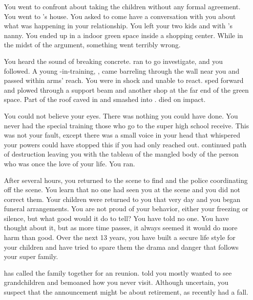 \documentclass[char]{LRSguildcamp1}
\begin{document}
You went to confront \cAS{} about taking the children without any formal agreement. You went to \cOS{}'s house. You asked \cAS{} to come have a conversation with you about what was happening in your relationship. You left your two kids and \cGrad{} with \cGrad{}'s nanny. You ended up in a indoor green space inside a shopping center. While in the midst of the argument, something went terribly wrong.

You heard the sound of breaking concrete. \cAS{} ran to go investigate, and you followed. A young \cJuggernaut{\hero}-in-training, \cJuggernaut{}, came barreling through the wall near you and passed within arms' reach. You were in shock and unable to react. \cJuggernaut{} sped forward and plowed through a support beam and another shop at the far end of the green space. Part of the roof caved in and smashed into \cAS{}. \cAS{\They} died on impact. 

You could not believe your eyes. There was nothing you could have done.  You never had the special training those who go to the super high school receive. This was not your fault, except there was a small voice in your head that whispered your powers could have stopped this if you had only reached out. \cJuggernaut{} continued \cJuggernaut{\their} path of destruction leaving you with the tableau of the mangled body of the person who was once the love of your life. You ran. 

After several hours, you returned to the scene to find \cOS{} and the police coordinating off the scene. You learn that no one had seen you at the scene and you did not correct them. Your children were returned to you that very day and you began funeral arrangements. You are not proud of your behavior, either your freezing or silence, but what good would it do to tell? You have told no one. You have thought about it, but as more time passes, it always seemed it would do more harm than good. Over the next 13 years, you have built a secure life style for your children and have tried to spare them the drama and danger that follows your super family. 

\cGrandma{} has called the family together for an reunion. \cGrandma{\They} told you mostly \cGrandma{\they} wanted to see \cGrandma{\their} grandchildren and bemoaned how you never visit. Although uncertain, you suspect that the announcement might be about \cGrandma{\their} retirement, as \cGrandma{\they} recently had a fall.
\end{document}
